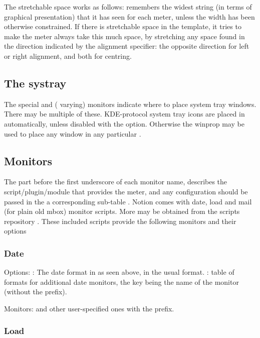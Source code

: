 The stretchable space works as follows:  remembers
the widest string (in terms of graphical presentation) that it has
seen for each meter, unless the width has been otherwise constrained.
If there is stretchable space in the template, it tries to make the
meter always take this much space, by stretching any space found in
the direction indicated by the alignment specifier: the opposite
direction for left or right alignment, and both for centring.

\subsection{The systray}

The special  and 
(\codestr{*} varying) monitors indicate where to place system tray 
windows.  There may be multiple of these. KDE-protocol system tray
icons are placed in  automatically, unless disabled 
with the  option. Otherwise the  winprop may
be used to place any window in any particular .

\subsection{Monitors}

The part before the first
underscore of each monitor name, describes the script/plugin/module
that provides the meter, and any configuration should be passed
in the a corresponding sub-table .
Notion comes with date, load and mail (for plain old mbox) 
 monitor scripts. More may be obtained from 
the scripts repository \cite{scripts}. These included scripts 
provide the following monitors and their options

\subsubsection{Date}

Options: : The date format in as seen above, 
in the usual  format. : table of
formats for additional date monitors, the key being the name
of the monitor (without the  prefix).

Monitors:  and other user-specified ones with the
 prefix.


\subsubsection{Load}

